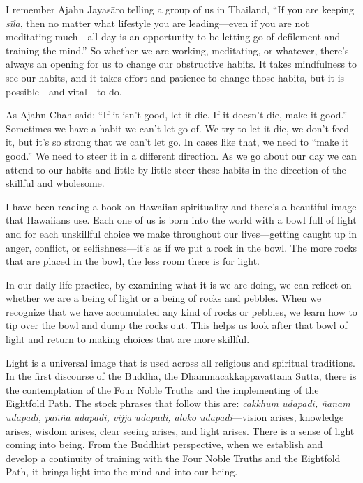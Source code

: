 I remember Ajahn Jayasāro telling a group of us in Thailand, ``If you 
are keeping \emph{sīla}, then no matter what lifestyle you are 
leading---even if you are not meditating much---all day is an 
opportunity to be letting go of defilement and training the mind.'' So 
whether we are working, meditating, or whatever, there's always an 
opening for us to change our obstructive habits. It takes mindfulness 
to see our habits, and it takes effort and patience to change those 
habits, but it is possible---and vital---to do.

As Ajahn Chah said: ``If it isn't good, let it die. If it doesn't die, 
make it good.'' Sometimes we have a habit we can't let go of. We try to 
let it die, we don't feed it, but it's so strong that we can't let go. 
In cases like that, we need to ``make it good.'' We need to steer it in 
a different direction. As we go about our day we can attend to our 
habits and little by little steer these habits in the direction of the 
skillful and wholesome.


I have been reading a book on Hawaiian spirituality and there's a 
beautiful image that Hawaiians use. Each one of us is born into the 
world with a bowl full of light and for each unskillful choice we make 
throughout our lives---getting caught up in anger, conflict, or 
selfishness---it's as if we put a rock in the bowl. The more rocks that 
are placed in the bowl, the less room there is for light.

In our daily life practice, by examining what it is we are doing, we 
can reflect on whether we are a being of light or a being of rocks and 
pebbles. When we recognize that we have accumulated any kind of rocks 
or pebbles, we learn how to tip over the bowl and dump the rocks out. 
This helps us look after that bowl of light and return to making 
choices that are more skillful.

Light is a universal image that is used across all religious and 
spiritual traditions. In the first discourse of the Buddha, the 
Dhammacakkappavattana Sutta, there is the contemplation of the Four 
Noble Truths and the implementing of the Eightfold Path. The stock 
phrases that follow this are: \emph{cakkhuṃ udapādi, ñāṇaṃ 
udapādi, paññā udapādi, vijjā udapādi, āloko udapādi}---vision 
arises, knowledge arises, wisdom arises, clear seeing arises, and light 
arises. There is a sense of light coming into being. From the Buddhist 
perspective, when we establish and develop a continuity of training 
with the Four Noble Truths and the Eightfold Path, it brings light into 
the mind and into our being.

